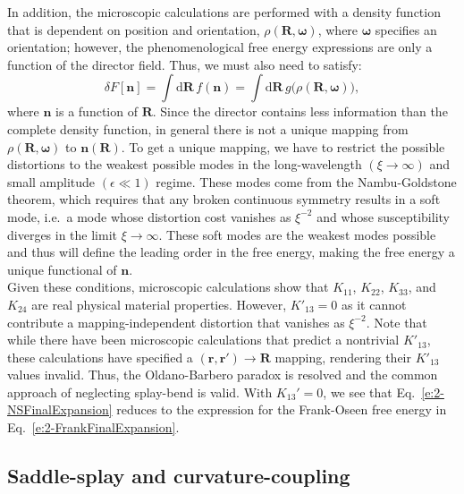 In addition, the microscopic calculations are performed with a density function that is dependent on position and orientation, $\rho(\mathbf{R},\mathbf{\omega})$, where $\mathbf{\omega}$ specifies an orientation; however, the phenomenological free energy expressions are only a function of the director field.
Thus, we must also need to satisfy:
\begin{equation}
  \delta F[\mathbf{n}] = \int \textrm{d} \mathbf{R} \, f(\mathbf{n}) = \int \textrm{d} \mathbf{R} \, g \big ( \rho(\mathbf{R},\mathbf{\omega}) \big),\label{e:2-LessInfo}
\end{equation}
where $\mathbf{n}$ is a function of $\mathbf{R}$.
Since the director contains less information than the complete density function, in general there is not a unique mapping from  $\rho(\mathbf{R},\mathbf{\omega})$ to $\mathbf{n}(\mathbf{R})$.
To get a unique mapping, we have to restrict the possible distortions to the weakest possible modes in the long-wavelength $(\xi \rightarrow \infty)$ and small amplitude $(\epsilon \ll 1)$ regime.
These modes come from the Nambu-Goldstone theorem, which requires that any broken continuous symmetry results in a soft mode, i.e.\ a mode whose distortion cost vanishes as $\xi^{-2}$ and whose susceptibility diverges in the limit $\xi \rightarrow \infty$.
These soft modes are the weakest modes possible and thus will define the leading order in the free energy, making the free energy a unique functional of $\mathbf{n}$. \\

Given these conditions, microscopic calculations show that $K_{11}$, $K_{22}$, $K_{33}$, and $K_{24}$ are real physical material properties.
However, $K'_{13} = 0$ as it cannot contribute a mapping-independent distortion that vanishes as $\xi^{-2}$.
Note that while there have been microscopic calculations that predict a nontrivial $K'_{13}$, these calculations have specified a $(\mathbf{r},\mathbf{r}') \rightarrow \mathbf{R}$ mapping, rendering their $K'_{13}$ values invalid.
Thus, the Oldano-Barbero paradox is resolved and the common approach of neglecting splay-bend is valid.
With $K_{13}'=0$, we see that Eq.~\ref{e:2-NSFinalExpansion} reduces to the expression for the Frank-Oseen free energy in Eq.~\ref{e:2-FrankFinalExpansion}.


\subsection{Saddle-splay and curvature-coupling}



